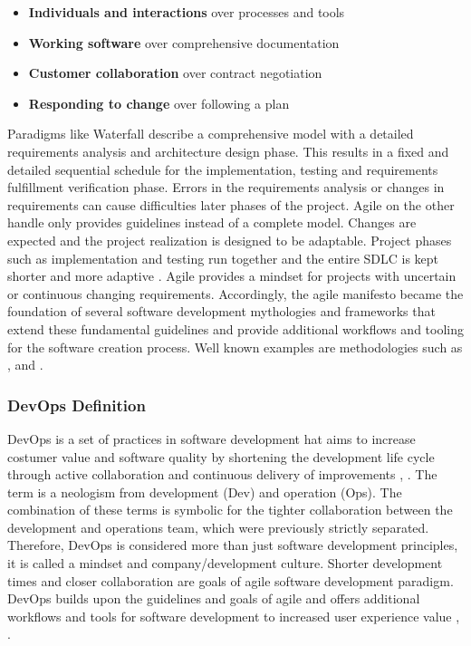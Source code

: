 \documentclass[12pt, a4paper]{article}
\begin{document}
        \begin{itemize}[label=\(\star\)]
            \setlength\itemsep{0em}
            \item \textbf{Individuals and interactions} over processes and tools
            \item \textbf{Working software} over comprehensive documentation
            \item \textbf{Customer collaboration} over contract negotiation
            \item \textbf{Responding to change} over following a plan
        \end{itemize}

        \noindent Paradigms like Waterfall describe a comprehensive model with a detailed requirements analysis and architecture design phase. This results in a fixed and detailed sequential schedule for the implementation, testing and requirements fulfillment verification phase. Errors in the requirements analysis or changes in requirements can cause difficulties later phases of the project. Agile on the other handle only provides guidelines instead of a complete model. Changes are expected and the project realization is designed to be adaptable. Project phases such as implementation and testing run together and the entire \ac{SDLC} is kept shorter and more adaptive \cite{agile_practice}.\newline
        Agile provides a mindset for projects with uncertain or continuous changing requirements. Accordingly, the agile manifesto became the foundation of several software development mythologies and frameworks that extend these fundamental guidelines and provide additional workflows and tooling for the software creation process. Well known examples are methodologies such as ,  and .

        \subsubsection{DevOps Definition}
        DevOps is a set of practices in software development hat aims to increase costumer value and software quality by shortening the development life cycle through active collaboration and continuous delivery of improvements \cite{base_devops}, \cite{effective_devops}. The term  is a neologism from development (Dev) and operation (Ops). The combination of these terms is symbolic for the tighter collaboration between the development and operations team, which were previously strictly separated. Therefore, DevOps is considered more than just software development principles, it is called a mindset and company/development culture. Shorter development times and closer collaboration are goals of agile software development paradigm. DevOps builds upon the guidelines and goals of agile and offers additional workflows and tools for software development to increased user experience value \cite{azuredevops}, \cite{effective_devops}.
\end{document}
